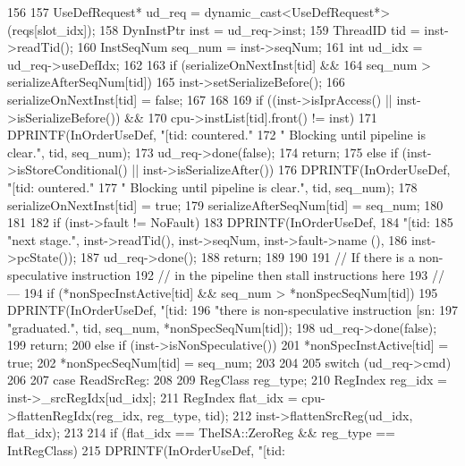 \begin{DoxyCode}
156 {
157     UseDefRequest* ud_req = dynamic_cast<UseDefRequest*>(reqs[slot_idx]);
158     DynInstPtr inst = ud_req->inst;
159     ThreadID tid = inst->readTid();
160     InstSeqNum seq_num = inst->seqNum;
161     int ud_idx = ud_req->useDefIdx;
162 
163     if (serializeOnNextInst[tid] &&
164         seq_num > serializeAfterSeqNum[tid]) {
165         inst->setSerializeBefore();
166         serializeOnNextInst[tid] = false;
167     }
168 
169     if ((inst->isIprAccess() || inst->isSerializeBefore()) &&
170         cpu->instList[tid].front() != inst) {
171         DPRINTF(InOrderUseDef, "[tid:%
      countered."
172                 " Blocking until pipeline is clear.\n", tid, seq_num);
173         ud_req->done(false);
174         return;
175     } else if (inst->isStoreConditional() || inst->isSerializeAfter()) {
176         DPRINTF(InOrderUseDef, "[tid:%
      ountered."
177                 " Blocking until pipeline is clear.\n", tid, seq_num);
178         serializeOnNextInst[tid] = true;
179         serializeAfterSeqNum[tid] = seq_num;
180     }
181 
182     if (inst->fault != NoFault) {
183         DPRINTF(InOrderUseDef,
184                 "[tid:%
185                 "next stage.\n", inst->readTid(), inst->seqNum, inst->fault->name
      (),
186                 inst->pcState());
187         ud_req->done();
188         return;
189     }
190 
191     // If there is a non-speculative instruction
192     // in the pipeline then stall instructions here
193     // ---
194     if (*nonSpecInstActive[tid] && seq_num > *nonSpecSeqNum[tid]) {
195         DPRINTF(InOrderUseDef, "[tid:%
196                 "there is non-speculative instruction [sn:%
197                 "graduated.\n", tid, seq_num, *nonSpecSeqNum[tid]);
198         ud_req->done(false);
199         return;
200     } else if (inst->isNonSpeculative()) {
201         *nonSpecInstActive[tid] = true;
202         *nonSpecSeqNum[tid] = seq_num;
203     }
204 
205     switch (ud_req->cmd)
206     {
207       case ReadSrcReg:
208         {
209             RegClass reg_type;
210             RegIndex reg_idx = inst->_srcRegIdx[ud_idx];
211             RegIndex flat_idx = cpu->flattenRegIdx(reg_idx, reg_type, tid);
212             inst->flattenSrcReg(ud_idx, flat_idx);
213             
214             if (flat_idx == TheISA::ZeroReg && reg_type == IntRegClass) {
215                 DPRINTF(InOrderUseDef, "[tid:%
}}}}
\end{DoxyCode}
